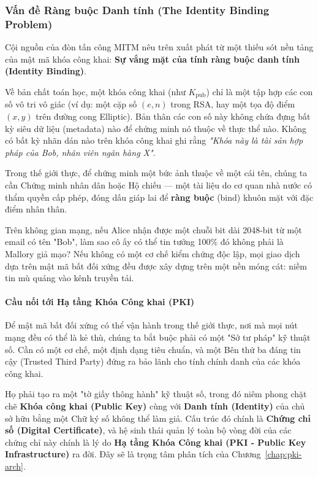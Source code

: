 \subsubsection*{Vấn đề Ràng buộc Danh tính (The Identity Binding Problem)}

Cội nguồn của đòn tấn công MITM nêu trên xuất phát từ một thiếu sót nền tảng của mật mã khóa công khai: \textbf{Sự vắng mặt của tính ràng buộc danh tính (Identity Binding)}. 

Về bản chất toán học, một khóa công khai (như $K_{\mathrm{pub}}$) chỉ là một tập hợp các con số vô tri vô giác (ví dụ: một cặp số $(e, n)$ trong RSA, hay một tọa độ điểm $(x, y)$ trên đường cong Elliptic). Bản thân các con số này không chứa đựng bất kỳ siêu dữ liệu (metadata) nào để chứng minh nó thuộc về thực thể nào. Không có bất kỳ nhãn dán nào trên khóa công khai ghi rằng \textit{"Khóa này là tài sản hợp pháp của Bob, nhân viên ngân hàng X"}.

Trong thế giới thực, để chứng minh một bức ảnh thuộc về một cái tên, chúng ta cần Chứng minh nhân dân hoặc Hộ chiếu --- một tài liệu do cơ quan nhà nước có thẩm quyền cấp phép, đóng dấu giáp lai để \textbf{ràng buộc} (bind) khuôn mặt với đặc điểm nhân thân. 

Trên không gian mạng, nếu Alice nhận được một chuỗi bit dài 2048-bit từ một email có tên "Bob", làm sao cô ấy có thể tin tưởng 100\% đó không phải là Mallory giả mạo? Nếu không có một cơ chế kiểm chứng độc lập, mọi giao dịch dựa trên mật mã bất đối xứng đều được xây dựng trên một nền móng cát: niềm tin mù quáng vào kênh truyền tải.

\paragraph*{Cầu nối tới Hạ tầng Khóa Công khai (PKI)}
Để mật mã bất đối xứng có thể vận hành trong thế giới thực, nơi mà mọi nút mạng đều có thể là kẻ thù, chúng ta bắt buộc phải có một "Sở tư pháp" kỹ thuật số. Cần có một cơ chế, một định dạng tiêu chuẩn, và một Bên thứ ba đáng tin cậy (Trusted Third Party) đứng ra bảo lãnh cho tính chính danh của các khóa công khai.

Họ phải tạo ra một "tờ giấy thông hành" kỹ thuật số, trong đó niêm phong chặt chẽ \textbf{Khóa công khai (Public Key)} cùng với \textbf{Danh tính (Identity)} của chủ sở hữu bằng một Chữ ký số không thể làm giả. Cấu trúc đó chính là \textbf{Chứng chỉ số (Digital Certificate)}, và hệ sinh thái quản lý toàn bộ vòng đời của các chứng chỉ này chính là lý do \textbf{Hạ tầng Khóa Công khai (PKI - Public Key Infrastructure)} ra đời. Đây sẽ là trọng tâm phân tích của Chương~\ref{chap:pki-arch}.
